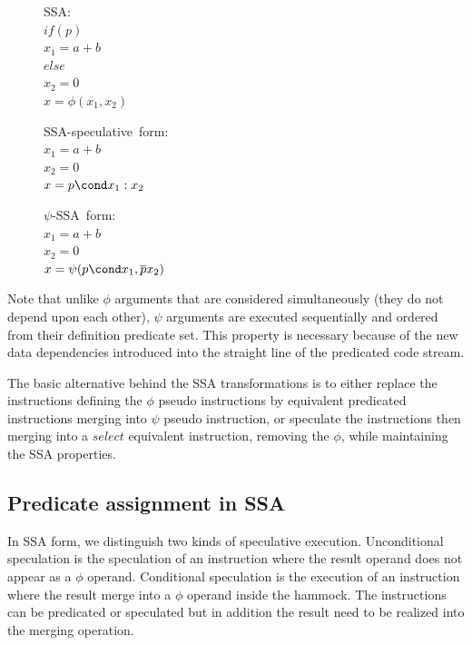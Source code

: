 \begin{figure}
\begin{minipage}[t]{3.5cm}
\mbox{SSA:} \\
$ if (p) $ \\
$   x_1 = a+b $ \\
$ else $ \\
$   x_2 = 0 $ \\
$ x = \phi (x_1, x_2) $ \\
\end{minipage}
\begin{minipage}[t]{3.5cm}
\mbox{SSA-speculative form:} \\
$x_1 = a + b $ \\
$x_2 = 0 $ \\
$x = p \cond  x_1 : x_2$ \\
\end{minipage}
\begin{minipage}[t]{3.5cm}
\mbox{$\psi$-SSA form:} \\
$x_1 = a + b $ \\
$x_2 = 0 $\\
$x = \psi (p \cond x_1, \overline{p} x_2) $ \\
\end{minipage}
\end{figure}

Note that unlike $\phi$ arguments that are considered simultaneously (they do not depend upon each other), $\psi$ arguments are executed sequentially and ordered from their definition predicate set. This property is necessary because of the new data dependencies introduced into the straight line of the predicated code stream.

The basic alternative behind the SSA transformations is to either replace the instructions defining the $\phi$ pseudo instructions by equivalent predicated instructions merging into $\psi$ pseudo instruction, or speculate the instructions then merging into a $select$ equivalent instruction, removing the $\phi$, while maintaining the SSA properties.

\subsection{Predicate assignment in SSA}

In SSA form, we distinguish two kinds of speculative execution. Unconditional speculation is the speculation of an instruction where the result operand does not appear as a $\phi$ operand. Conditional speculation is the execution of an instruction where the result merge into a $\phi$ operand inside the hammock. The instructions can be predicated or speculated but in addition the result need to be realized into the merging operation.

